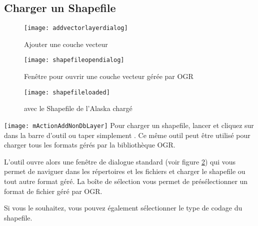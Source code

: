 \subsection{Charger un Shapefile}\label{sec:load_shapefile}

\begin{figure}[ht]
   \begin{center}  
   \texttt{[image: addvectorlayerdialog]}
   \caption{Ajouter une couche vecteur \nixcaption}\label{fig:addvectorlayer}
\end{center}
\end{figure}

\begin{figure}[ht]
  \begin{center} 
  \texttt{[image: shapefileopendialog]}
  \caption{Fenêtre pour ouvrir une couche vecteur gérée par OGR \nixcaption}\label{fig:openshapefile}
\end{center}
\end{figure}

\begin{figure}[ht]
  \begin{center}
  \texttt{[image: shapefileloaded]}
    \caption{\qg avec le Shapefile de l'Alaska chargé \nixcaption}\label{fig:loadedshapefile}
\end{center}
\end{figure}

\texttt{[image: mActionAddNonDbLayer]} Pour charger un shapefile, 
lancer \qg et cliquez sur  dans la barre d'outil ou taper simplement 
. Ce même outil peut être utilisé pour charger tous les formats 
gérés par la bibliothèque OGR.

L'outil ouvre alors une fenêtre de dialogue standard (voir figure 
\ref{fig:openshapefile}) qui vous permet de naviguer dans les 
répertoires et les fichiers et charger le shapefile ou tout autre 
format géré.
La boîte de sélection  vous 
permet de présélectionner un format de fichier géré par OGR.

Si vous le souhaitez, vous pouvez également sélectionner le type de codage du 
shapefile.

